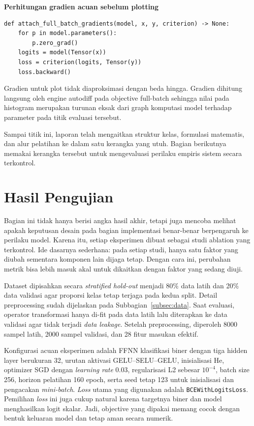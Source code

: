 \documentclass{article}
\begin{document}
\noindent\textbf{Perhitungan gradien acuan sebelum plotting}\par
\begin{lstlisting}
def attach_full_batch_gradients(model, x, y, criterion) -> None:
    for p in model.parameters():
        p.zero_grad()
    logits = model(Tensor(x))
    loss = criterion(logits, Tensor(y))
    loss.backward()
\end{lstlisting}
Gradien untuk plot tidak diaproksimasi dengan beda hingga. Gradien dihitung langsung oleh engine autodiff pada objective full-batch sehingga nilai pada histogram merupakan turunan eksak dari graph komputasi model terhadap parameter pada titik evaluasi tersebut.

Sampai titik ini, laporan telah mengaitkan struktur kelas, formulasi matematis, dan alur pelatihan ke dalam satu kerangka yang utuh. Bagian berikutnya memakai kerangka tersebut untuk mengevaluasi perilaku empiris sistem secara terkontrol.

\section{Hasil Pengujian}
Bagian ini tidak hanya berisi angka hasil akhir, tetapi juga mencoba melihat apakah keputusan desain pada bagian implementasi benar-benar berpengaruh ke perilaku model. Karena itu, setiap eksperimen dibuat sebagai studi ablation yang terkontrol. Ide dasarnya sederhana: pada setiap studi, hanya satu faktor yang diubah sementara komponen lain dijaga tetap. Dengan cara ini, perubahan metrik bisa lebih masuk akal untuk dikaitkan dengan faktor yang sedang diuji.

Dataset dipisahkan secara \textit{stratified hold-out} menjadi 80\% data latih dan 20\% data validasi agar proporsi kelas tetap terjaga pada kedua split. Detail preprocessing sudah dijelaskan pada Subbagian~\ref{subsec:data}. Saat evaluasi, operator transformasi hanya di-fit pada data latih lalu diterapkan ke data validasi agar tidak terjadi \textit{data leakage}. Setelah preprocessing, diperoleh 8000 sampel latih, 2000 sampel validasi, dan 28 fitur masukan efektif.

Konfigurasi acuan eksperimen adalah FFNN klasifikasi biner dengan tiga hidden layer berukuran 32, urutan aktivasi GELU--SELU--GELU, inisialisasi He, optimizer SGD dengan \textit{learning rate} 0.03, regularisasi L2 sebesar $10^{-4}$, batch size 256, horizon pelatihan 160 epoch, serta seed tetap 123 untuk inisialisasi dan pengacakan \textit{mini-batch}. \textit{Loss} utama yang digunakan adalah \texttt{BCEWithLogitsLoss}. Pemilihan \textit{loss} ini juga cukup natural karena targetnya biner dan model menghasilkan logit skalar. Jadi, objective yang dipakai memang cocok dengan bentuk keluaran model dan tetap aman secara numerik.
\end{document}
